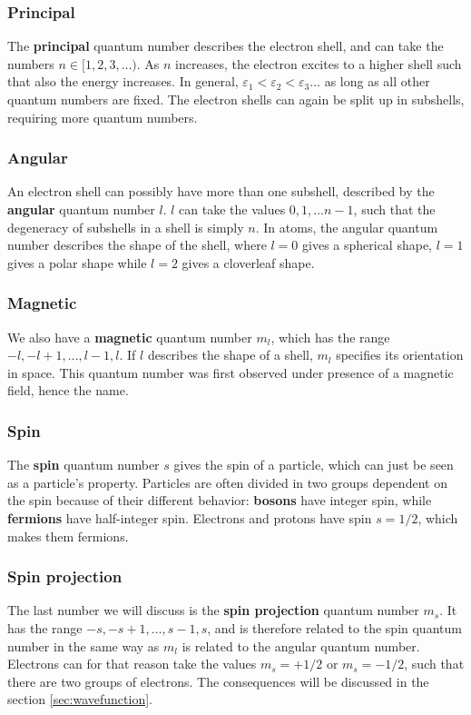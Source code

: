 \subsubsection*{Principal}
The \textbf{principal} quantum number describes the electron shell, and can take the numbers $n\in[1,2,3,\hdots)$. As $n$ increases, the electron excites to a higher shell such that also the energy increases. In general, $\varepsilon_1<\varepsilon_2<\varepsilon_3\hdots$ as long as all other quantum numbers are fixed. The electron shells can again be split up in subshells, requiring more quantum numbers.

\subsubsection*{Angular}
An electron shell can possibly have more than one subshell, described by the \textbf{angular} quantum number $l$. $l$ can take the values $0,1,\hdots n-1$, such that the degeneracy of subshells in a shell is simply $n$. In atoms, the angular quantum number describes the shape of the shell, where $l=0$ gives a spherical shape, $l=1$ gives a polar shape while $l=2$ gives a cloverleaf shape. 

\subsubsection*{Magnetic}
We also have a \textbf{magnetic} quantum number $m_l$, which has the range $-l,-l+1,\hdots,l-1,l$. If $l$ describes the shape of a shell, $m_l$ specifies its orientation in space. This quantum number was first observed under presence of a magnetic field, hence the name.

\subsubsection*{Spin}
The \textbf{spin} quantum number $s$ gives the spin of a particle, which can just be seen as a particle's property. Particles are often divided in two groups dependent on the spin because of their different behavior: \textbf{bosons} have integer spin, while \textbf{fermions} have half-integer spin. Electrons and protons have spin $s=1/2$, which makes them fermions.

\subsubsection*{Spin projection}
The last number we will discuss is the \textbf{spin projection} quantum number $m_s$. It has the range $-s,-s+1,\hdots,s-1,s$, and is therefore related to the spin quantum number in the same way as $m_l$ is related to the angular quantum number. Electrons can for that reason take the values $m_s=+1/2$ or $m_s=-1/2$, such that there are two groups of electrons. The consequences will be discussed in the section \eqref{sec:wavefunction}.

